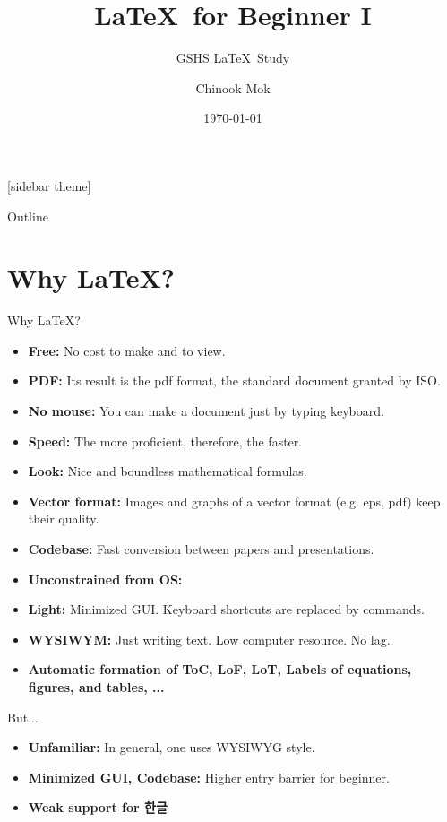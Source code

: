 \documentclass[12pt]{gshs_lecture}
\title[]{\LaTeX\ for Beginner I}
\subtitle[]{GSHS \LaTeX\ Study}
\author[]{Chinook Mok}
\institute[GSHS]{Gyeonggi Science High School\\ for the gifted}
\date[]{\today}
\begin{document}
\begin{frame}[plain]
\titlepage
\end{frame}
[sidebar theme]

\begin{frame}[t]{Outline}
\tableofcontents%
\end{frame}

\section{Why \LaTeX ?} %

\begin{frame}[t,fragile]{Why \LaTeX ?}\small
\vspace*{-1em}
\begin{itemize}
\item \textcolor{GSHSRED}{\textbf{Free:}} No cost to make and to view.
\item \textcolor{GSHSRED}{\textbf{PDF:}} Its result is the pdf format, the standard document granted by ISO.
\item \textcolor{GSHSRED}{\textbf{No mouse:}} You can make a document just by typing keyboard.
\item \textcolor{GSHSRED}{\textbf{Speed:}} The more proficient, therefore, the faster.
\item \textcolor{GSHSRED}{\textbf{Look:}} Nice and boundless mathematical formulas.
\item \textcolor{GSHSRED}{\textbf{Vector format:}} Images and graphs of a vector format (e.g. eps, pdf) keep their quality.
\item \textcolor{GSHSRED}{\textbf{Codebase:}} Fast conversion between papers and presentations.
\item \textcolor{GSHSRED}{\textbf{Unconstrained from OS:}}
\item \textcolor{GSHSRED}{\textbf{Light:}} Minimized GUI. Keyboard shortcuts are replaced by commands.
\item \textcolor{GSHSRED}{\textbf{WYSIWYM:}} Just writing text. Low computer resource. No lag.
\item \textcolor{GSHSRED}{\textbf{Automatic formation of ToC, LoF, LoT, Labels of equations, figures, and tables, ...}}
\end{itemize}
\end{frame}

\begin{frame}[t]{But...}\small
\begin{itemize}
\item \textcolor{GSHSRED}{\textbf{Unfamiliar:}} In general, one uses WYSIWYG style.
\item \textcolor{GSHSRED}{\textbf{Minimized GUI, Codebase:}} Higher entry barrier for beginner.
\item \textcolor{GSHSRED}{\textbf{Weak support for 한글}}
\end{itemize}
\par\vspace{5em}
\footnotesize{}
\end{frame}
\end{document}
